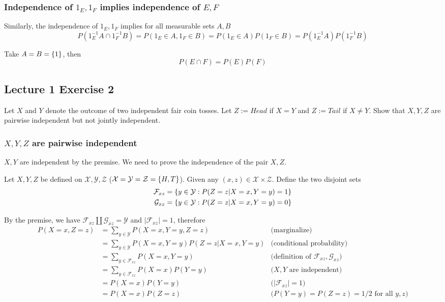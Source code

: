\documentclass{article}
\begin{document}
\subsubsection{Independence of $1_E, 1_F$ implies independence of $E, F$}

Similarly, the independence of $1_E, 1_F$ implies for all measurable sets $A, B$
$$
    P(1_E^{-1} A \cap 1_F^{-1} B) = P(1_E \in A, 1_F \in B) = P(1_E \in A) P(1_F \in B) = P(1_E^{-1} A) P(1_F^{-1} B)
$$

Take $A = B = \{1\}$, then
$$
    P(E \cap F) = P(E) P(F)
$$

\subsection{Lecture 1 Exercise 2}

Let $X$ and $Y$ denote the outcome of two independent fair coin tosses. Let $Z := Head$ if $X = Y$ and $Z := Tail$ if $X \neq Y$. Show that $X, Y, Z$ are pairwise independent but not jointly independent.

\subsubsection{$X, Y, Z$ are pairwise independent}

$X, Y$ are independent by the premise. We need to prove the independence of the pair $X, Z$.

Let $X, Y, Z$ be defined on $\mathcal{X}, \mathcal{Y}, \mathcal{Z}$ ($\mathcal{X} = \mathcal{Y} = \mathcal{Z} = \{H, T\}$). Given any $(x, z) \in \mathcal{X} \times \mathcal{Z}$. Define the two disjoint sets
\begin{align*}
    \mathcal{F}_{xz} &= \{y \in \mathcal{Y}: P(Z=z|X=x, Y=y) = 1\} \\
    \mathcal{G}_{xz} &= \{y \in \mathcal{Y}: P(Z=z|X=x, Y=y) = 0\}
\end{align*}

By the premise, we have $\mathcal{F}_{xz} \amalg \mathcal{G}_{xz} = \mathcal{Y}$ and $|\mathcal{F}_{xz}| = 1$, therefore
\begin{align*}
    P(X=x, Z=z)
    &= \sum_{y \in \mathcal{Y}} P(X=x, Y=y, Z=z) &\text{(marginalize)} \\
    &= \sum_{y \in \mathcal{Y}} P(X=x, Y=y) P(Z=z | X=x, Y=y) &\text{(conditional probability)} \\
    &= \sum_{y \in \mathcal{F}_{xz}} P(X=x, Y=y) &\text{(definition of $\mathcal{F}_{xz}, \mathcal{G}_{xz}$)} \\
    &= \sum_{y \in \mathcal{F}_{xz}} P(X=x) P(Y=y) &\text{($X, Y$ are independent)} \\
    &= P(X=x) P(Y=y) &\text{($|\mathcal{F}_{xz}| = 1$)} \\ 
    &= P(X=x) P(Z=z) &\text{($P(Y=y) = P(Z=z) = 1/2$ for all $y, z$)}
\end{align*}
\end{document}
